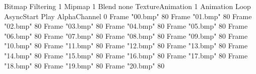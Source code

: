 {Bitmap
	{Filtering 1}
	{Mipmap 1}
	{Blend none}
	{TextureAnimation 1}
	{Animation Loop AsyncStart Play}
	{AlphaChannel 0}
	{Frame "00.bmp" 80}
	{Frame "01.bmp" 80}
	{Frame "02.bmp" 80}
	{Frame "03.bmp" 80}
	{Frame "04.bmp" 80}
	{Frame "05.bmp" 80}
	{Frame "06.bmp" 80}
	{Frame "07.bmp" 80}
	{Frame "08.bmp" 80}
	{Frame "09.bmp" 80}
	{Frame "10.bmp" 80}
	{Frame "11.bmp" 80}
	{Frame "12.bmp" 80}
	{Frame "13.bmp" 80}
	{Frame "14.bmp" 80}
	{Frame "15.bmp" 80}
	{Frame "16.bmp" 80}
	{Frame "17.bmp" 80}
	{Frame "18.bmp" 80}
	{Frame "19.bmp" 80}
	{Frame "20.bmp" 80}
}
